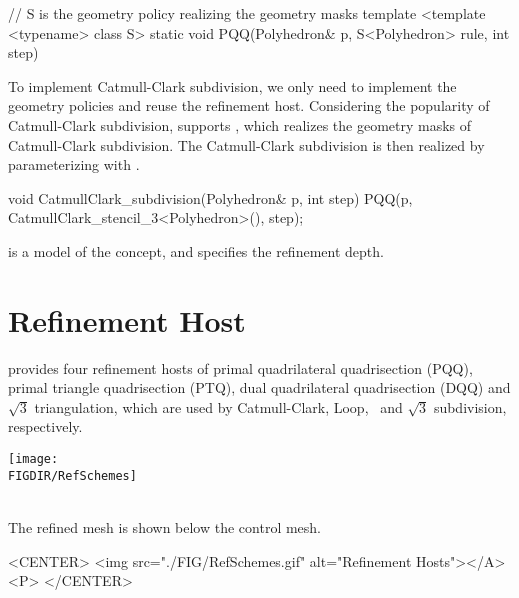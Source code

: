\begin{ccExampleCode}
  // S is the geometry policy realizing the geometry masks
  template <template <typename> class S>
  static void PQQ(Polyhedron& p, S<Polyhedron> rule, int step)
\end{ccExampleCode}

To implement Catmull-Clark subdivision, we only need to implement
the geometry policies and reuse the  refinement host.
Considering the popularity of Catmull-Clark subdivision,
 supports ,
which realizes the geometry masks of Catmull-Clark subdivision. 
The Catmull-Clark subdivision is then realized by parameterizing 
 with 
.

\begin{ccExampleCode}
  void CatmullClark_subdivision(Polyhedron& p, int step) {
    PQQ(p, CatmullClark_stencil_3<Polyhedron>(), step);
  }
\end{ccExampleCode}

 is a model of the 
concept, and  specifies the refinement depth.


\section{Refinement Host}
 provides four refinement hosts of primal 
quadrilateral quadrisection (PQQ), primal triangle 
quadrisection (PTQ), dual quadrilateral 
quadrisection (DQQ) and $\sqrt{3}$ triangulation, which 
are used by Catmull-Clark, Loop, \DS\ and $\sqrt{3}$ subdivision, 
respectively. 

\begin{ccTexOnly}
  \begin{center}
    \parbox{0.6\textwidth}{%
      \texttt{[image: \\FIGDIR/RefSchemes]}%
    }\\ \vspace{0.5cm}
    The refined mesh is shown below the control mesh.
  \end{center}
\end{ccTexOnly}

\begin{ccHtmlOnly}
  <CENTER>
     <img src="./FIG/RefSchemes.gif" alt="Refinement Hosts"></A><P>
  </CENTER>
\end{ccHtmlOnly}


